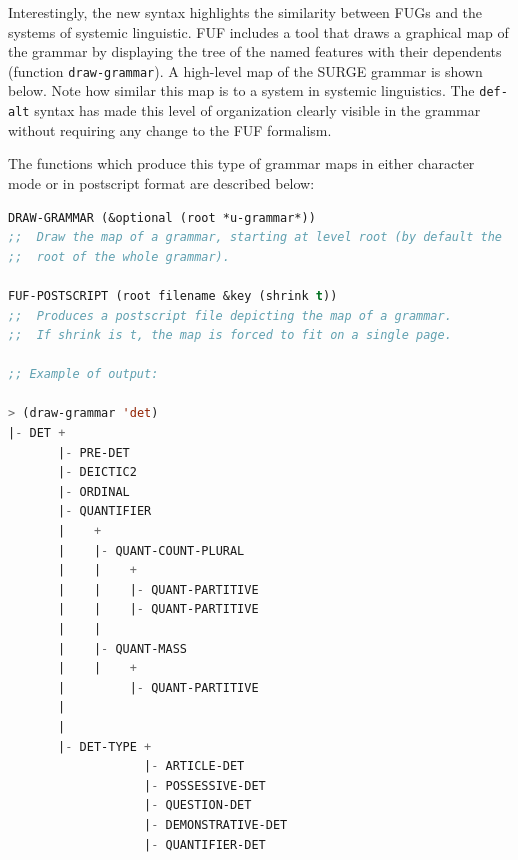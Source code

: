 \documentclass[10pt,a4paper]{report}
\begin{document}
Interestingly, the new syntax highlights the similarity between \textsc{FUG}s
and the systems of systemic linguistic.  FUF includes a tool that draws a
graphical map of the grammar by displaying the tree of the named features
with their dependents (function {\tt draw-grammar}).  A high-level map of the
SURGE grammar is shown below.  Note how similar this map is to a system in
systemic linguistics.  The {\tt def-alt} syntax has made this level of
organization clearly visible in the grammar without requiring any change to
the FUF formalism.

The functions which produce this type of grammar maps in either character
mode or in postscript format are described below:

\begin{lstlisting}[language=Lisp]
DRAW-GRAMMAR (&optional (root *u-grammar*))
;;	Draw the map of a grammar, starting at level root (by default the 
;; 	root of the whole grammar).

FUF-POSTSCRIPT (root filename &key (shrink t))
;;	Produces a postscript file depicting the map of a grammar.
;; 	If shrink is t, the map is forced to fit on a single page.

;; Example of output:

> (draw-grammar 'det)
|- DET +
       |- PRE-DET
       |- DEICTIC2
       |- ORDINAL
       |- QUANTIFIER
       |    +
       |    |- QUANT-COUNT-PLURAL
       |    |    +
       |    |    |- QUANT-PARTITIVE
       |    |    |- QUANT-PARTITIVE
       |    |    
       |    |- QUANT-MASS
       |    |    +
       |         |- QUANT-PARTITIVE
       |         
       |    
       |- DET-TYPE +
                   |- ARTICLE-DET
                   |- POSSESSIVE-DET
                   |- QUESTION-DET
                   |- DEMONSTRATIVE-DET
                   |- QUANTIFIER-DET
                   
       
\end{lstlisting}
\end{document}
